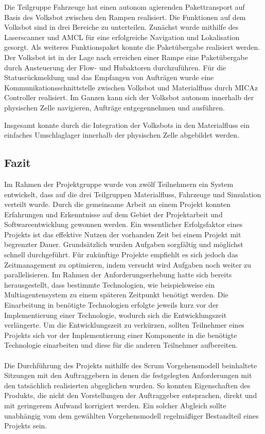 Die Teilgruppe Fahrzeuge hat einen autonom agierenden Pakettransport auf Basis des Volksbot zwischen den Rampen realisiert. Die Funktionen auf dem Volksbot sind in drei Bereiche zu unterteilen. Zunächst wurde mithilfe des Laserscanner und AMCL für eine erfolgreiche Navigation und Lokalisation gesorgt. Als weiteres Funktionspaket konnte die Paketübergabe realisiert werden. Der Volksbot ist in der Lage nach erreichen einer Rampe eine Paketübergabe durch Ansteuerung der Flow- und Hubaktoren durchzuführen. Für die Statusrückmeldung und das Empfangen von Aufträgen wurde eine Kommunikationsschnittstelle zwischen Volksbot und Materialfluss durch MICAz Controller realisiert. Im Ganzen kann sich der Volksbot autonom innerhalb der physischen Zelle navigieren, Aufträge entgegennehmen und ausführen.

Insgesamt konnte durch die Integration der Volksbots in den Materialfluss ein einfaches Umschlaglager innerhalb der physischen Zelle abgebildet werden. 



\subsection{Fazit}
Im Rahmen der Projektgruppe wurde von zwölf Teilnehmern ein System entwickelt, dass auf die drei Teilgruppen Materialfluss, Fahrzeuge und Simulation verteilt wurde. Durch die gemeinsame Arbeit an einem Projekt konnten Erfahrungen und Erkenntnisse auf dem Gebiet der Projektarbeit und Softwareentwicklung gewonnen werden. Ein wesentlicher Erfolgsfaktor eines Projekts ist das effektive Nutzen der vorhanden Zeit bei einem Projekt mit begrenzter Dauer. Grundsätzlich wurden Aufgaben sorgfältig und möglichst schnell durchgeführt. Für zukünftige Projekte empfiehlt es sich jedoch das Zeitmanagement zu optimieren, indem versucht wird Aufgaben noch weiter zu parallelisieren. Im Rahmen der Anforderungserhebung hatte sich bereits herausgestellt, dass bestimmte Technologien, wie beispielsweise ein Multiagentensystem zu einem späteren Zeitpunkt benötigt werden. Die Einarbeitung in benötigte Technologien erfolgte jeweils kurz vor der Implementierung einer Technologie, wodurch sich die Entwicklungszeit verlängerte. Um die Entwicklungszeit zu verkürzen, sollten Teilnehmer eines Projekts sich vor der Implementierung einer Komponente in die benötigte Technologie einarbeiten und diese für die anderen Teilnehmer aufbereiten. 
\\\\
Die Durchführung des Projekts mithilfe des Scrum Vorgehensmodell beinhaltete Sitzungen mit den Auftraggebern in denen die festgelegten Anforderungen mit den tatsächlich realisierten abgeglichen wurden. So konnten Eigenschaften des Produkts, die nicht den Vorstellungen der Auftraggeber entsprachen, direkt und mit geringerem Aufwand korrigiert werden. Ein solcher Abgleich sollte unabhängig vom dem gewählten Vorgehensmodell regelmäßiger Bestandteil eines Projekts sein. 
 

